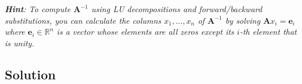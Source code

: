 \documentclass[11pt]{report}
\theoremstyle{definition}
\newcommand{\mat}[1]{\mathbf{#1}}
\begin{document}
\textit{
	\textbf{Hint}: To compute $\mat{A}^{-1}$ using LU decompositions and
	forward/backward substitutions, you can calculate the columns $x_1,\ldots,x_n$
	of $\mat{A}^{-1}$ by solving $\mat{A}x_i=\mat{e}_i$ where $\mat{e}_i\in\mathbb{R}^n$
	is a vector whose elements are all zeros except its $i$-th element that is unity.
}

\subsection*{Solution}

\newpage
\printbibliography
\end{document}
